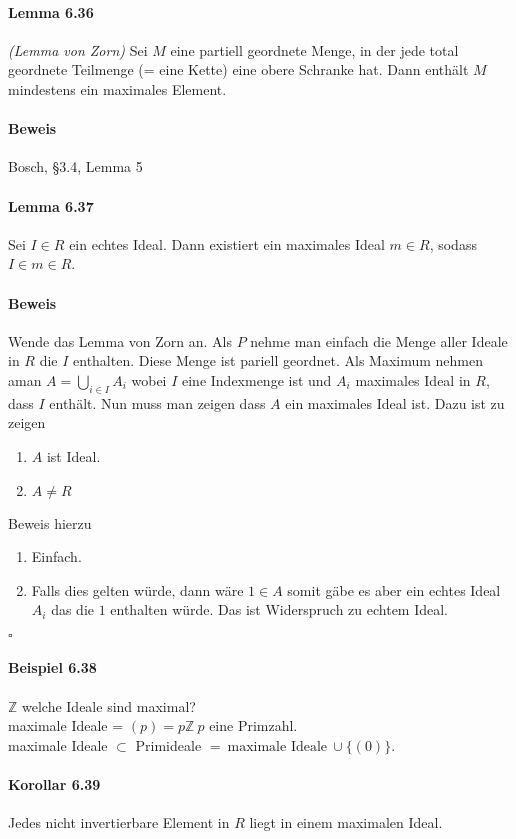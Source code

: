 \documentclass{scrartcl}
\begin{document}
\paragraph{Lemma 6.36}
\textit{(Lemma von Zorn)} Sei $M$ eine partiell geordnete Menge, in der jede
total geordnete Teilmenge (= eine Kette) eine obere Schranke hat.
Dann enthält $M$ mindestens ein maximales Element.
\paragraph{Beweis}
Bosch, §3.4, Lemma 5

\paragraph{Lemma 6.37}
Sei $I \in R$ ein echtes Ideal. Dann existiert ein maximales Ideal $m \in R$,
sodass $I \in m \in R$.
\paragraph{Beweis}
Wende das Lemma von Zorn an. Als $P$ nehme man einfach die Menge aller Ideale in
$R$ die $I$ enthalten. Diese Menge ist pariell geordnet. Als Maximum nehmen aman
$A = \bigcup_{i \in I} A_i$ wobei $I$ eine Indexmenge ist und $A_i$ maximales
Ideal in $R$, dass $I$ enthält. Nun muss man zeigen dass $A$ ein maximales Ideal
ist. Dazu ist zu zeigen
\begin{enumerate}{}
\item $A$ ist Ideal.
\item $A \neq R$
\end{enumerate}
Beweis hierzu
\begin{enumerate}{}
\item Einfach.
\item Falls dies gelten würde, dann wäre $1 \in A$ somit gäbe es aber ein echtes
  Ideal $A_i$ das die $1$ enthalten würde. Das ist Widerspruch zu echtem Ideal.
\end{enumerate}
\hfill $\square$

\paragraph{Beispiel 6.38} $\mathbb{Z}$ welche Ideale sind maximal? \\
maximale Ideale = $(p) = p \mathbb{Z} ~p$ eine Primzahl. \\
maximale Ideale $\subset$ Primideale $= ~\text{maximale Ideale}~ \cup \{(0)\}$.

\paragraph{Korollar 6.39}
Jedes nicht invertierbare Element in $R$ liegt in einem maximalen Ideal.
\end{document}
